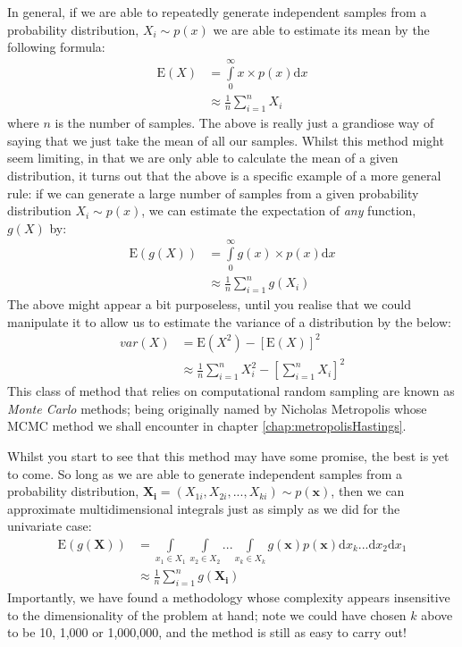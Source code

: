 \documentclass[11pt,fullpage]{book}
\begin{document}
In general, if we are able to repeatedly generate independent samples from a probability distribution, $X_i\sim p(x)$ we are able to estimate its mean by the following formula:
%
\begin{align}
\mathrm{E}(X) &= \int\limits_{0}^{\infty} x \times p(x) \mathrm{d}x\\
&\approx \frac{1}{n} \sum\limits_{i=1}^{n} X_i
\end{align}
%
where $n$ is the number of samples. The above is really just a grandiose way of saying that we just take the mean of all our samples. Whilst this method might seem limiting, in that we are only able to calculate the mean of a given distribution, it turns out that the above is a specific example of a more general rule: if we can generate a large number of samples from a given probability distribution $X_i\sim p(x)$, we can estimate the expectation of \textit{any} function, $g(X)$ by:
%
\begin{align}
\mathrm{E}(g(X)) &= \int\limits_{0}^{\infty} g(x) \times p(x) \mathrm{d}x\\
&\approx \frac{1}{n} \sum\limits_{i=1}^{n} g(X_i)
\end{align}
%
The above might appear a bit purposeless, until you realise that we could manipulate it to allow us to estimate the variance of a distribution by the below:
%
\begin{align}
var(X) &= \mathrm{E}(X^2) - \left[\mathrm{E}(X)\right]^2\\
&\approx \frac{1}{n} \sum\limits_{i=1}^{n} X_i^2 - \left[\sum\limits_{i=1}^{n} X_i\right]^2
\end{align}
%
This class of method that relies on computational random sampling are known as \textit{Monte Carlo} methods; being originally named by Nicholas Metropolis whose MCMC method we shall encounter in chapter \ref{chap:metropolisHastings}. 

Whilst you start to see that this method may have some promise, the best is yet to come. So long as we are able to generate independent samples from a probability distribution, $\boldsymbol{X_i}=(X_{1i},X_{2i},...,X_{ki})\sim p(\boldsymbol{x})$, then we can approximate multidimensional integrals just as simply as we did for the univariate case:
%
\begin{align}
\mathrm{E}(g(\boldsymbol{X})) &= \int\limits_{x_1\in X_1}\int\limits_{x_2\in X_2}...\int\limits_{x_{k}\in X_{k}} g(\boldsymbol{x}) p(\boldsymbol{x}) \mathrm{d}x_{k} ... \mathrm{d}x_{2}\mathrm{d}x_{1}\\
&\approx \frac{1}{n} \sum\limits_{i=1}^{n} g(\boldsymbol{X_i})
\end{align}
%
Importantly, we have found a methodology whose complexity appears insensitive to the dimensionality of the problem at hand; note we could have chosen $k$ above to be 10, 1,000 or 1,000,000, and the method is still as easy to carry out!
\end{document}
